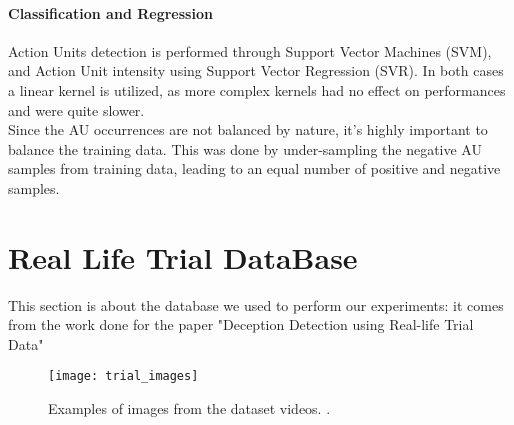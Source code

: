 \paragraph{Classification and Regression}
Action Units detection is performed through Support Vector Machines (SVM), and Action Unit intensity using Support Vector Regression (SVR). In both cases a linear kernel is utilized, as more complex kernels had no effect on performances and were quite slower. \\
Since the AU occurrences are not balanced by nature, it's highly important to balance the training data. This was done by under-sampling the negative AU samples from training data, leading to an equal number of positive and negative samples.\\

\section{Real Life Trial DataBase} \label{rldb}
This section is about the database we used to perform our experiments: it comes from the work done for the paper "Deception Detection using Real-life Trial Data" \cite{Perez-Rosas:2015:DDU:2818346.2820758} \\

\begin{figure}[H]
	\centering
	\texttt{[image: trial\_images]}
	\caption{Examples of images from the dataset videos. \cite{Perez-Rosas:2015:DDU:2818346.2820758}.}
	\label{fig:trial_images}
\end{figure}


